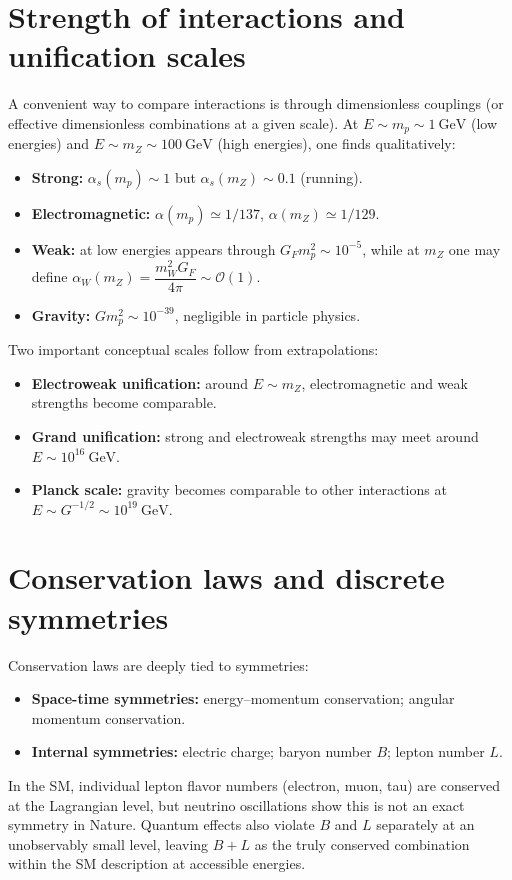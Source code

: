 \section{Strength of interactions and unification scales}
A convenient way to compare interactions is through dimensionless couplings (or effective
dimensionless combinations at a given scale). At $E\sim m_p\sim 1~\text{GeV}$ (low energies)
and $E\sim m_Z\sim 100~\text{GeV}$ (high energies), one finds qualitatively:
\begin{itemize}
  \item \textbf{Strong:} $\alpha_s(m_p)\sim 1$ but $\alpha_s(m_Z)\sim 0.1$ (running).
  \item \textbf{Electromagnetic:} $\alpha(m_p)\simeq 1/137$, $\alpha(m_Z)\simeq 1/129$.
  \item \textbf{Weak:} at low energies appears through $G_F m_p^2\sim 10^{-5}$, while at $m_Z$ one may define $\alpha_W(m_Z)=\dfrac{m_W^2 G_F}{4\pi}\sim \mathcal{O}(1)$.
  \item \textbf{Gravity:} $G m_p^2\sim 10^{-39}$, negligible in particle physics.
\end{itemize}

Two important conceptual scales follow from extrapolations:
\begin{itemize}
  \item \textbf{Electroweak unification:} around $E\sim m_Z$, electromagnetic and weak strengths become comparable.
  \item \textbf{Grand unification:} strong and electroweak strengths may meet around $E\sim 10^{16}~\text{GeV}$.
  \item \textbf{Planck scale:} gravity becomes comparable to other interactions at $E\sim G^{-1/2}\sim 10^{19}~\text{GeV}$.
\end{itemize}

\section{Conservation laws and discrete symmetries}
Conservation laws are deeply tied to symmetries:
\begin{itemize}
  \item \textbf{Space-time symmetries:} energy--momentum conservation; angular momentum conservation.
  \item \textbf{Internal symmetries:} electric charge; baryon number $B$; lepton number $L$.
\end{itemize}
In the SM, individual lepton flavor numbers (electron, muon, tau) are conserved at the Lagrangian level,
but neutrino oscillations show this is not an exact symmetry in Nature.
Quantum effects also violate $B$ and $L$ separately at an unobservably small level, leaving $B+L$
as the truly conserved combination within the SM description at accessible energies.

